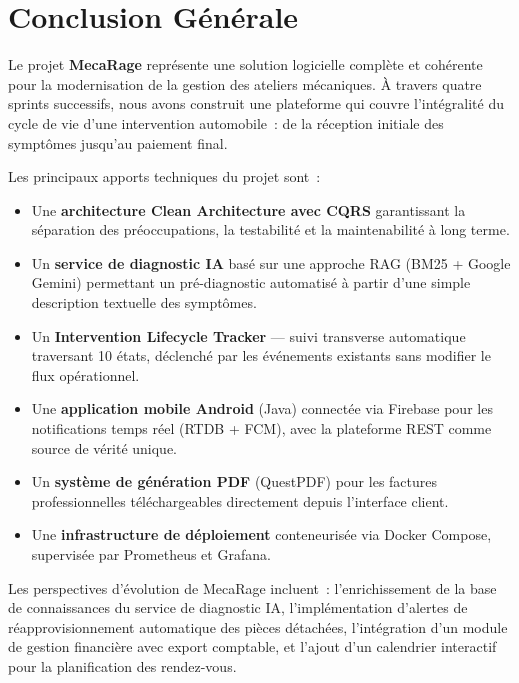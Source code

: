 \documentclass[12pt,a4paper]{report}
\begin{document}
\chapter*{Conclusion Générale}

\setlength{\parskip}{6pt}

Le projet \textbf{MecaRage} représente une solution logicielle complète et cohérente
pour la modernisation de la gestion des ateliers mécaniques. À travers quatre sprints
successifs, nous avons construit une plateforme qui couvre l'intégralité du cycle de
vie d'une intervention automobile~: de la réception initiale des symptômes jusqu'au
paiement final.

\bigskip

Les principaux apports techniques du projet sont~:
\begin{itemize}[noitemsep]
  \item Une \textbf{architecture Clean Architecture avec CQRS} garantissant la
    séparation des préoccupations, la testabilité et la maintenabilité à long terme.
  \item Un \textbf{service de diagnostic IA} basé sur une approche RAG (BM25 + Google
    Gemini) permettant un pré-diagnostic automatisé à partir d'une simple description
    textuelle des symptômes.
  \item Un \textbf{Intervention Lifecycle Tracker} — suivi transverse automatique
    traversant 10 états, déclenché par les événements existants sans modifier le flux
    opérationnel.
  \item Une \textbf{application mobile Android} (Java) connectée via Firebase pour
    les notifications temps réel (RTDB + FCM), avec la plateforme REST comme
    source de vérité unique.
  \item Un \textbf{système de génération PDF} (QuestPDF) pour les factures
    professionnelles téléchargeables directement depuis l'interface client.
  \item Une \textbf{infrastructure de déploiement} conteneurisée via Docker Compose,
    supervisée par Prometheus et Grafana.
\end{itemize}

\bigskip

Les perspectives d'évolution de MecaRage incluent~: l'enrichissement de la base de
connaissances du service de diagnostic IA, l'implémentation d'alertes de réapprovisionnement
automatique des pièces détachées, l'intégration d'un module de gestion financière avec
export comptable, et l'ajout d'un calendrier interactif pour la planification des
rendez-vous.
\end{document}
